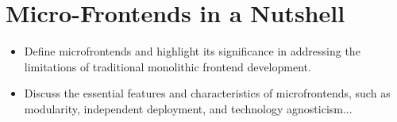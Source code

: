 \section{Micro-Frontends in a Nutshell}
\begin{itemize}
   \item Define microfrontends and highlight its significance in addressing the limitations of traditional monolithic frontend development.
   \item Discuss the essential features and characteristics of microfrontends, such as modularity, independent deployment, and technology agnosticism...
\end{itemize}
